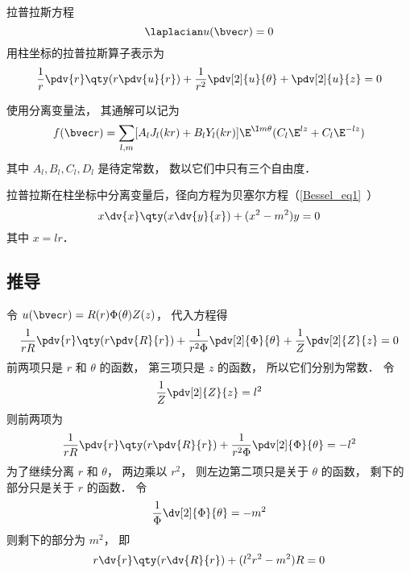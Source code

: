 

拉普拉斯方程
\begin{equation}
\laplacian u(\bvec r) = 0
\end{equation}
用柱坐标的拉普拉斯算子表示为
\begin{equation}
\frac{1}{r}\pdv{r}\qty(r \pdv{u}{r}) + \frac{1}{r^2} \pdv[2]{u}{\theta} + \pdv[2]{u}{z} = 0
\end{equation}

使用分离变量法， 其通解可以记为
\begin{equation}
f(\bvec r) = \sum_{l,m} [A_l J_l(kr) + B_l Y_l(kr)]\E^{\I m \theta} (C_l\E^{lz} + C_l \E^{-lz})
\end{equation}
其中 $A_l, B_l, C_l, D_l$ 是待定常数， 数以它们中只有三个自由度．

拉普拉斯在柱坐标中分离变量后，径向方程为贝塞尔方程（\autoref{Bessel_eq1}~）
\begin{equation}
x \dv{x} \qty(x \dv{y}{x}) + (x^2 - m^2)y = 0
\end{equation}
其中 $x = lr$．

\subsection{推导}
令 $u(\bvec r) = R(r) \Phi(\theta) Z(z)$， 代入方程得
\begin{equation}
\frac{1}{rR}\pdv{r} \qty(r\pdv{R}{r}) + \frac{1}{r^2 \Phi} \pdv[2]{\Phi}{\theta} + \frac{1}{Z} \pdv[2]{Z}{z} = 0
\end{equation}
前两项只是 $r$ 和 $\theta $ 的函数， 第三项只是 $z$ 的函数， 所以它们分别为常数． 令
\begin{equation}\label{CylLap_eq4}
\frac{1}{Z} \pdv[2]{Z}{z} = l^2
\end{equation}
则前两项为
\begin{equation}
\frac{1}{rR} \pdv{r} \qty(r\pdv{R}{r}) + \frac{1}{r^2 \Phi} \pdv[2]{\Phi}{\theta} =  - l^2
\end{equation}
为了继续分离 $r$ 和 $\theta$， 两边乘以 $r^2$，   则左边第二项只是关于 $\theta$  的函数， 剩下的部分只是关于 $r$ 的函数． 令
\begin{equation}\label{CylLap_eq6}
\frac{1}{\Phi } \dv[2]{\Phi}{\theta} = -m^2
\end{equation}
则剩下的部分为 $m^2$， 即
\begin{equation}\label{CylLap_eq7}
r \dv{r} \qty(r\dv{R}{r}) + (l^2 r^2 - m^2)R = 0
\end{equation}

